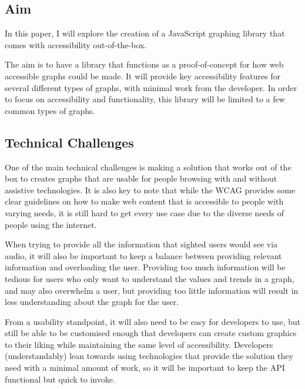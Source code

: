 \documentclass[ %
                    author={Aleena Baig},
                supervisor={Dr Simon Lock},
                    degree={BSc},
                     title={On Making Web Accessible Graphs},
                  subtitle={},
                      year={2019} ]{dissertation}
\begin{document}
\subsection{Aim}

In this paper, I will explore the creation of a JavaScript graphing library that comes with accessibility out-of-the-box.

The aim is to have a library that functions as a proof-of-concept for how web accessible graphs could be made. It will provide key accessibility features for several different types of graphs, with minimal work from the developer. In order to focus on accessibility and functionality, this library will be limited to a few common types of graphs.

\subsection{Technical Challenges}

One of the main technical challenges is making a solution that works out of the box to creates graphs that are usable for people browsing with and without assistive technologies. It is also key to note that while the WCAG provides some clear guidelines on how to make web content that is accessible to people with varying needs, it is still hard to get every use case due to the diverse needs of people using the internet.

When trying to provide all the information that sighted users would see via audio, it will also be important to keep a balance between providing relevant information and overloading the user. Providing too much information will be tedious for users who only want to understand the values and trends in a graph, and may also overwhelm a user, but providing too little information will result in less understanding about the graph for the user.

From a usability standpoint, it will also need to be easy for developers to use, but still be able to be customised enough that developers can create custom graphics to their liking while maintaining the same level of accessibility. Developers (understandably) lean towards using technologies that provide the solution they need with a minimal amount of work, so it will be important to keep the API functional but quick to invoke.

\end{document}
